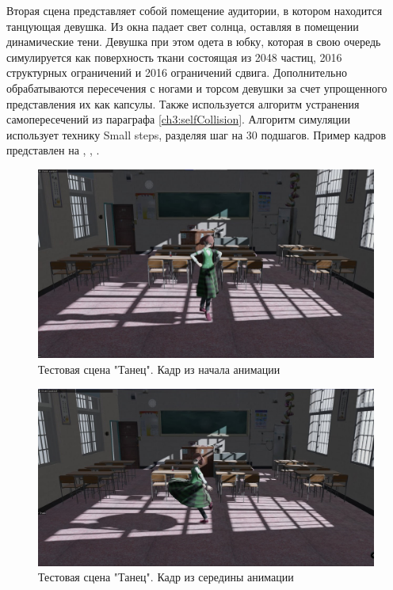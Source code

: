 	\FloatBarrier
	
	Вторая сцена представляет собой помещение аудитории, в котором находится танцующая девушка. Из окна падает свет солнца, оставляя в помещении динамические тени. Девушка при этом одета в юбку, которая в свою очередь симулируется как поверхность ткани состоящая из 2048 частиц, 2016 структурных ограничений и 2016 ограничений сдвига. Дополнительно обрабатываются пересечения с ногами и торсом девушки за счет упрощенного представления их как капсулы. Также используется алгоритм устранения самопересечений из параграфа \ref{ch3:selfCollision}. Алгоритм симуляции использует технику Small steps, разделяя шаг на 30 подшагов. Пример кадров представлен на , , .
	
	\begin{figure}[ht!] 
		\center
		\includegraphics [scale=0.35] {my_folder/images//dance1}	
		\caption{Тестовая сцена "Танец". Кадр из начала анимации} 
		\label{fig:dance1}
	\end{figure}

	\begin{figure}[ht!] 
		\center
		\includegraphics [scale=0.35] {my_folder/images//dance2}	
		\caption{Тестовая сцена "Танец". Кадр из середины анимации} 
		\label{fig:dance2}
	\end{figure}

